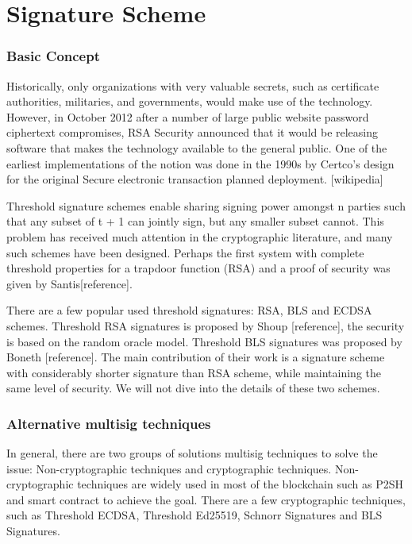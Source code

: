 \section{Signature Scheme}
\label{sec:sig}

\subsubsection*{Basic Concept}

Historically, only organizations with very valuable secrets, such as certificate authorities, militaries, and governments, would make use of the technology. However, in October 2012 after a number of large public website password ciphertext compromises, RSA Security announced that it would be releasing software that makes the technology available to the general public. One of the earliest implementations of the notion was done in the 1990s by Certco's design for the original Secure electronic transaction planned deployment. [wikipedia]

Threshold signature schemes enable sharing signing power amongst n parties such that any subset of t + 1 can jointly sign, but any smaller subset cannot. This problem has received much attention in the cryptographic literature, and many such schemes have been designed. Perhaps the first system with complete threshold properties for a trapdoor function (RSA) and a proof of security was given by Santis[reference].
 
There are a few popular used threshold signatures: RSA, BLS and ECDSA schemes. Threshold RSA signatures is proposed by Shoup [reference], the security is based on the random oracle model. Threshold BLS signatures was proposed by Boneth [reference]. The main contribution of their work is a signature scheme with considerably shorter signature than RSA scheme, while maintaining the same level of security.  We will not dive into the details of these two schemes.


\subsubsection*{Alternative multisig techniques}

In general, there are two groups of solutions multisig techniques to solve the issue: Non-cryptographic techniques and cryptographic techniques. Non-cryptographic techniques are widely used in most of the blockchain such as P2SH and smart contract to achieve the goal. There are a few cryptographic techniques, such as Threshold ECDSA, Threshold Ed25519, Schnorr Signatures and BLS Signatures. 

